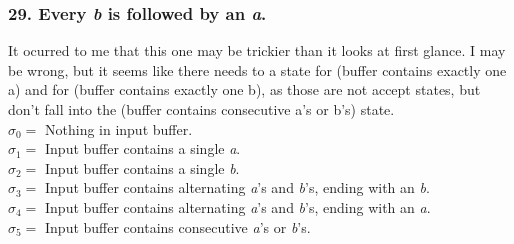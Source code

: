 \documentclass[12pt,titlepage]{article}
\begin{document}
\subsubsection*{29. Every \textit{b} is followed by an \textit{a}.}
It ocurred to me that this one may be trickier than it looks at first glance. I
may be wrong, but it seems like there needs to a state for (buffer contains
exactly one a) and for (buffer contains exactly one b), as those are not accept
states, but don't fall into the (buffer contains consecutive a's or b's) state.\\
$\sigma_0 = $ Nothing in input buffer.\\
$\sigma_1 = $ Input buffer contains a single \textit{a}.\\
$\sigma_2 = $ Input buffer contains a single \textit{b}.\\
$\sigma_3 = $ Input buffer contains alternating \textit{a}'s and \textit{b}'s,
ending with an \textit{b}.\\
$\sigma_4 = $ Input buffer contains alternating \textit{a}'s and \textit{b}'s,
ending with an \textit{a}.\\
$\sigma_5 = $ Input buffer contains consecutive \textit{a}'s or \textit{b}'s.\\
\end{document}
